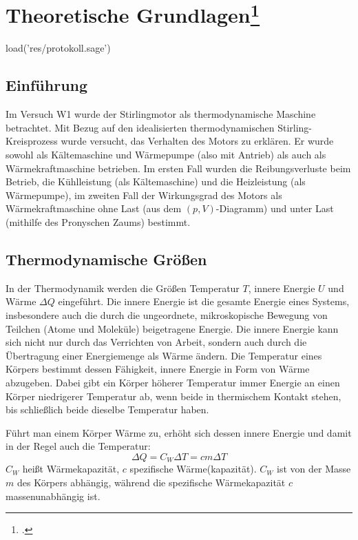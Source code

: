 \section[Theoretische Grundlagen]{Theoretische Grundlagen\footcite[Theoretische Grundlagen basierend auf:\label{anleitung-ss2014}]
[]{anleitung-ss2014}}

\begin{sagesilent}
load('res/protokoll.sage')
\end{sagesilent}

\subsection{Einführung}
Im Versuch W1 wurde der Stirlingmotor als thermodynamische Maschine betrachtet. Mit Bezug auf den idealisierten thermodynamischen Stirling-Kreisprozess wurde versucht, das Verhalten des Motors zu erklären. Er wurde sowohl als Kältemaschine und Wärmepumpe (also mit Antrieb) als auch als Wärmekraftmaschine betrieben. Im ersten Fall wurden die Reibungsverluste beim Betrieb, die Kühlleistung (als Kältemaschine) und die Heizleistung (als Wärmepumpe), im zweiten Fall der Wirkungsgrad des Motors als Wärmekraftmaschine ohne Last (aus dem $(p, V)$-Diagramm) und unter Last (mithilfe des Pronyschen Zaums) bestimmt.

\subsection{Thermodynamische Größen}
In der Thermodynamik werden die Größen Temperatur $T$, innere Energie $U$ und Wärme $\Delta Q$ eingeführt. Die innere Energie ist die gesamte Energie eines Systems, insbesondere auch die durch die ungeordnete, mikroskopische Bewegung von Teilchen (Atome und Moleküle) beigetragene Energie. Die innere Energie kann sich nicht nur durch das Verrichten von Arbeit, sondern auch durch die Übertragung einer Energiemenge als Wärme ändern. Die Temperatur eines Körpers bestimmt dessen Fähigkeit, innere Energie in Form von Wärme abzugeben. Dabei gibt ein Körper höherer Temperatur immer Energie an einen Körper niedrigerer Temperatur ab, wenn beide in thermischem Kontakt stehen, bis schließlich beide dieselbe Temperatur haben.

Führt man einem Körper Wärme zu, erhöht sich dessen innere Energie und damit in der Regel auch die Temperatur:
\begin{equation}\label{eq:wärmekapazität}
\Delta Q = C_W \Delta T = c m \Delta T
\end{equation}
$C_W$ heißt Wärmekapazität, $c$ spezifische Wärme(kapazität). $C_W$ ist von der Masse $m$ des Körpers abhängig, während die spezifische Wärmekapazität $c$ massenunabhängig ist.

